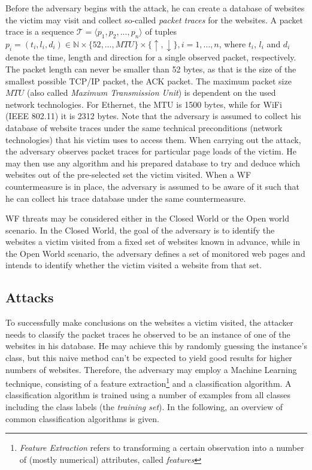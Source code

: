 \documentclass[
	ruledheaders=chapter,
	class=report,
	thesis={type=master, department=inf},
	accentcolor=1c,
	custommargins=true,
	marginpar=false,
	parskip=half-,
	fontsize=11pt,
]{tudapub}
\begin{document}
	Before the adversary begins with the attack, he can create a database of websites the victim may visit and collect so-called \textit{packet traces} for the websites. A packet trace is a sequence $\mathcal{T} = \langle p_1,p_2,...,p_n\rangle$ of tuples $p_i = (t_i, l_i, d_i) \in \mathbb{N} \times \{52, \ldots, MTU\} \times \{\uparrow, \downarrow\}, i = 1,\ldots,n$, where $t_i$, $l_i$ and $d_i$ denote the time, length and direction for a single observed packet, respectively. The packet length can never be smaller than 52 bytes, as that is the size of the smallest possible TCP/IP packet, the ACK packet. The maximum packet size $MTU$ (also called \textit{Maximum Transmission Unit}) is dependent on the used network technologies. For Ethernet, the MTU is 1500 bytes, while for WiFi (IEEE 802.11) it is 2312 bytes. Note that the adversary is assumed to collect his database of website traces under the same technical preconditions (network technologies) that his victim uses to access them. When carrying out the attack, the adversary observes packet traces for particular page loads of the victim. He may then use any algorithm and his prepared database to try and deduce which websites out of the pre-selected set the victim visited. When a WF countermeasure is in place, the adversary is assumed to be aware of it such that he can collect his trace database under the same countermeasure.
	
	WF threats may be considered either in the Closed World or the Open world scenario. In the Closed World, the goal of the adversary is to identify the websites a victim visited from a fixed set of websites known in advance, while in the Open World scenario, the adversary defines a set of monitored web pages and intends to identify whether the victim visited a website from that set.
	
	
	\subsection{Attacks}
	\label{theoretical:attacks}
	
	To successfully make conclusions on the websites a victim visited, the attacker needs to classify the packet traces he observed to be an instance of one of the websites in his database. He may achieve this by randomly guessing the instance's class, but this naive method can't be expected to yield good results for higher numbers of websites. Therefore, the adversary may employ a Machine Learning technique, consisting of a feature extraction\footnote{\textit{Feature Extraction} refers to transforming a certain observation into a number of (mostly numerical) attributes, called \textit{features}} and a classification algorithm. A classification algorithm is trained using a number of examples from all classes including the class labels (the \textit{training set}). In the following, an overview of common classification algorithms is given.
	
\end{document}
